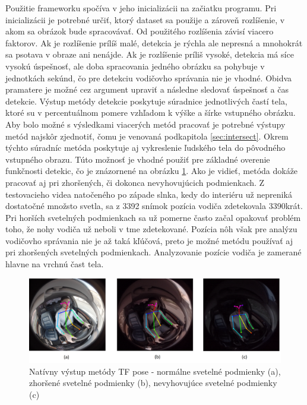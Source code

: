 \documentclass[slovak,master,dept460,male,cpp,cpdeclaration]{diploma}
\begin{document}
Použitie frameworku spočíva v jeho inicializácii na začiatku programu. Pri inicializácii je potrebné určiť, ktorý dataset  sa použije a zároveň rozlíšenie, v akom  sa obrázok bude spracovávať. Od použitého rozlíšenia závisí viacero faktorov. Ak je rozlíšenie prílíš malé, detekcia je rýchla ale nepresná a mnohokrát   sa psotava v obraze ani nenájde. Ak je rozlíšenie príliš vysoké, detekcia má síce vysokú úspešnosť, ale doba spracovania  jedného obrázku sa  pohybuje v jednotkách sekúnd, čo pre detekciu vodičovho správania nie je vhodné. Obidva pramatere je možné cez argument upraviť a následne sledovať úspešnosť a čas detekcie. Výstup metódy detekcie poskytuje súradnice jednotlivých častí tela, ktoré su v percentuálnom pomere vzhľadom k výške a šírke vstupného obrázku. Aby bolo možné s výsledkami viacerých metód pracovať je potrebné  výstupy metód najskôr zjednotiť, čomu je venovaná podkapitola \ref{sec:intersect}. Okrem týchto súradníc  metóda poskytuje  aj vykreslenie  ľudského tela do pôvodného vstupného obrazu. Túto možnosť je vhodné použiť pre základné overenie funkčnosti detekic, čo je znázornené na obrázku \ref{fig:tfResult}. Ako je vidieť, metóda dokáže pracovať aj pri zhoršených, či dokonca nevyhovujúcich podmienkach. Z testovacieho videa natočeného po západe slnka, kedy do interiéru už nepreniká dostatočné množsto svetla,  sa z 3392 snímok pozícia vodiča zdetekovala 3390krát. Pri horších svetelných podmienkach sa už pomerne často začal opakovať problém toho, že nohy vodiča už neboli v tme zdetekované. Pozícia nôh však pre analýzu vodičovho správania nie je až taká kľúčová, preto je možné metódu používať aj pri zhoršených svetelných podmienkach. Analyzovanie pozície vodiča je zamerané hlavne na vrchnú čast tela. 

\begin{figure}[H]
	\centering
	\includegraphics[width=1\textwidth]{Figures/tf_result.png}
	\caption{Natívny výstup metódy TF pose - normálne svetelné podmienky (a), zhoršené svetelné podmienky (b), nevyhovujúce svetelné podmienky (c)}
	\label{fig:tfResult}
\end{figure}
\end{document}
